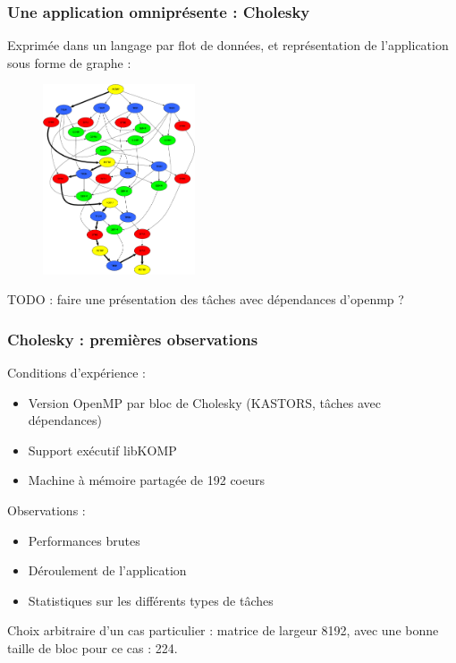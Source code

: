 \documentclass[xcolor={usenames,dvipsnames,svgnames,table}, aspectratio=43]{beamer}
\begin{document}
\begin{frame}
\frametitle{Une application omniprésente : Cholesky}

Exprimée dans un langage par flot de données, et représentation de l'application sous forme de graphe :
\begin{figure}
  \includegraphics[width=0.4\textwidth]{graph/cholesky-dag-5.pdf}
\end{figure}
TODO : faire une présentation des tâches avec dépendances d'openmp ?


\end{frame}

\begin{frame}
\frametitle{Cholesky : premières observations}

Conditions d'expérience :
\begin{itemize}
  \item Version OpenMP par bloc de Cholesky (KASTORS, tâches avec dépendances)
  \item Support exécutif libKOMP
  \item Machine à mémoire partagée de 192 coeurs
\end{itemize}

Observations :
\begin{itemize}
  \item Performances brutes
  \item Déroulement de l'application
  \item Statistiques sur les différents types de tâches
\end{itemize}

Choix arbitraire d'un cas particulier : matrice de largeur 8192, avec une bonne taille de bloc pour ce cas : 224.

\end{frame}
\end{document}
